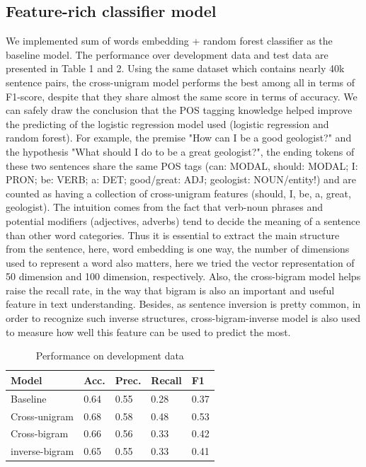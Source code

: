 \documentclass[11pt,a4paper]{article}
\begin{document}
\subsection{Feature-rich classifier model}
We implemented sum of words embedding + random forest classifier as the baseline model. The performance over development data and test data are presented in Table 1 and 2. Using the same dataset which contains nearly 40k sentence pairs, the cross-unigram model performs the best among all in terms of F1-score, despite that they share almost the same score in terms of accuracy. We can safely draw the conclusion that the POS tagging knowledge helped improve the predicting of the logistic regression model used (logistic regression and random forest). For example, the premise "How can I be a good geologist?" and the hypothesis "What should I do to be a great geologist?", the ending tokens of these two sentences share the same POS tags (can: MODAL, should: MODAL; I: PRON; be: VERB; a: DET; good/great: ADJ; geologist: NOUN/entity!) and are counted as having a collection of cross-unigram features (should, I, be, a, great, geologist). The intuition comes from the fact that verb-noun phrases and potential modifiers (adjectives, adverbs) tend to decide the meaning of a sentence than other word categories. Thus it is essential to extract the main structure from the sentence, here, word embedding is one way, the number of dimensions used to represent a word also matters, here we tried the vector representation of 50 dimension and 100 dimension, respectively. Also, the cross-bigram model helps raise the recall rate, in the way that bigram is also an important and useful feature in text understanding. Besides, as sentence inversion is pretty common, in order to recognize such inverse structures, cross-bigram-inverse model is also used to measure how well this feature can be used to predict the most.

\begin{table}[h]
\begin{center}
\begin{tabular}{|l|llll|}
\hline Model &  Acc. & Prec. &  Recall & F1 \\ \hline
Baseline  & 0.64 & 0.55 & 0.28 & 0.37\\
Cross-unigram & 0.68 & 0.58 & 0.48 & 0.53\\
Cross-bigram & 0.66 & 0.56 & 0.33 & 0.42\\
inverse-bigram& 0.65 & 0.55 & 0.33 & 0.41\\
\hline
\end{tabular}
\end{center}
\caption{ Performance on development data}
\end{table}
\end{document}
